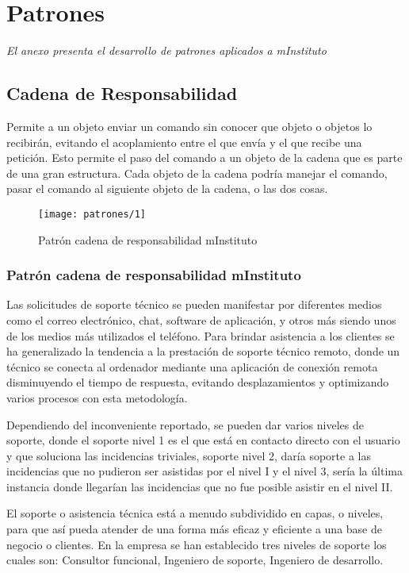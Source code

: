 \chapter{Patrones}
\label{apex:patrones}
\textit{El anexo presenta el desarrollo de patrones aplicados a mInstituto}
\vfill
\minitoc
\newpage

\section{Cadena de Responsabilidad}
Permite a un objeto enviar un comando sin conocer que objeto o objetos lo recibirán, evitando el acoplamiento entre el que envía y el que recibe una petición. Esto permite el paso del comando a un objeto de la cadena que es parte de una gran estructura. Cada objeto de la cadena podría manejar el comando, pasar el comando al siguiente objeto de la cadena, o las dos cosas. \cite{ref12}

  \begin{figure}[H]
 	\centering
  	\texttt{[image: patrones/1]}
  	\captionsetup{width=.95\textwidth}
  	\caption{Patrón cadena de responsabilidad mInstituto \cite{ref9,ref6}}
  	\label{patron1}
  \end{figure}

  \subsection{Patrón cadena de responsabilidad mInstituto}
  Las solicitudes de soporte técnico se pueden manifestar por diferentes medios como el correo electrónico, chat, software de aplicación, y otros más siendo unos de los medios más utilizados el teléfono. Para brindar asistencia a los clientes se ha generalizado la tendencia a la prestación de soporte técnico remoto, donde un técnico se conecta al ordenador mediante una aplicación de conexión remota disminuyendo el tiempo de respuesta, evitando desplazamientos y optimizando varios procesos con esta metodología.
  
  Dependiendo del inconveniente reportado, se pueden dar varios niveles de soporte, donde el soporte nivel 1 es el que está en contacto directo con el usuario y que soluciona las incidencias triviales, soporte nivel 2, daría soporte a las incidencias que no pudieron ser asistidas por el nivel I y el nivel 3, sería la última instancia donde llegarían las incidencias que no fue posible asistir en el nivel II.
  
  El soporte o asistencia técnica está a menudo subdividido en capas, o niveles, para que así pueda atender de una forma más eficaz y eficiente a una base de negocio o clientes. En la empresa se han establecido tres niveles de soporte los cuales son: Consultor funcional, Ingeniero de soporte, Ingeniero de desarrollo.

